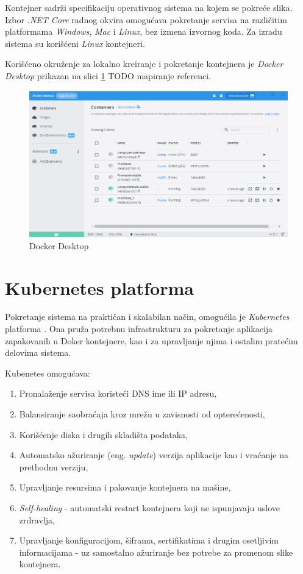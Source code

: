 \documentclass[12pt,oneside]{memoir}
\begin{document}
Kontejner sadrži specifikaciju operativnog sistema na kojem se pokreće slika. Izbor \emph{.NET Core} radnog okvira omogućava pokretanje servisa na različitim platformama \emph{Windows}, \emph{Mac} i \emph{Linux}, bez izmena izvornog koda. Za izradu sistema su korišćeni \emph{Linux} kontejneri.

Korišćeno okruženje za lokalno kreiranje i pokretanje kontejnera je \emph{Docker Desktop} prikazan na slici \ref{fig:dockerdesktop} TODO mapiranje referenci.

\begin{figure}[!ht]
  \centering
  \label{fig:dockerdesktop}
  \includegraphics[width=1.0\textwidth]{./images/docker_desktop.png}
  \caption{Docker Desktop}
\end{figure}

\section{Kubernetes platforma}

Pokretanje sistema na praktičan i skalabilan način, omogućila je \emph{Kubernetes} platforma \cite{Kubernetes}. Ona pruža potrebnu infrastrukturu za pokretanje aplikacija zapakovanih u Doker kontejnere, kao i za upravljanje njima i ostalim pratećim delovima sistema.

Kubenetes omogućava:
\begin{enumerate}
\item Pronalaženje servisa koristeći DNS ime ili IP adresu,
\item Balansiranje saobraćaja kroz mrežu u zavisnosti od opterećenosti,
\item Korišćenje diska i drugih skladišta podataka,
\item Automatsko ažuriranje (eng. \emph{update}) verzija aplikacije kao i vraćanje na prethodnu verziju,
\item Upravljanje resursima i pakovanje kontejnera na mašine,
\item \emph{Self-healing} - automatski restart kontejnera koji ne ispunjavaju uslove zrdravlja,
\item Upravljanje konfiguracijom, šiframa, sertifikatima i drugim osetljivim informacijama - uz samostalno ažuriranje bez potrebe za promenom slike kontejnera.
\end{enumerate}
\end{document}
